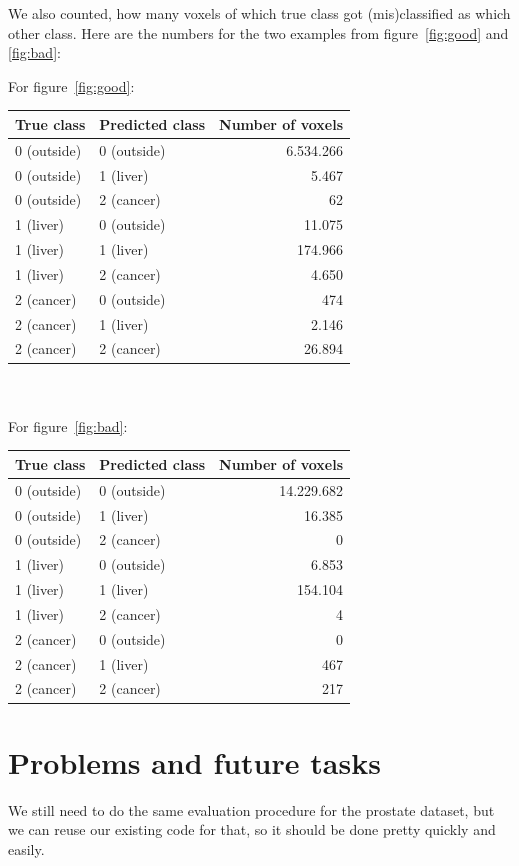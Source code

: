 \documentclass{article}
\begin{document}
		We also counted, how many voxels of which true class got (mis)classified as which other class. Here are the numbers for the two examples from figure~\ref{fig:good} and \ref{fig:bad}:

		For figure~\ref{fig:good}:

		\begin{tabular}{ | l | l || r | }
			\hline
			\textbf{True class} &
			\textbf{Predicted class} &
			\textbf{Number of voxels} \\ \hline
			0 (outside) & 0 (outside) & 6.534.266 \\ \hline
			0 (outside) & 1 (liver) & 5.467 \\ \hline
			0 (outside) & 2 (cancer) & 62 \\ \hline
			1 (liver) & 0 (outside) & 11.075 \\ \hline
			1 (liver) & 1 (liver) & 174.966 \\ \hline
			1 (liver) & 2 (cancer) & 4.650 \\ \hline
			2 (cancer) & 0 (outside) & 474 \\ \hline
			2 (cancer) & 1 (liver) & 2.146 \\ \hline
			2 (cancer) & 2 (cancer) & 26.894 \\ \hline
		\end{tabular}\\ \\

		For figure~\ref{fig:bad}:

		\begin{tabular}{ | l | l || r | }
			\hline
			\textbf{True class} &
			\textbf{Predicted class} &
			\textbf{Number of voxels} \\ \hline
			0 (outside) & 0 (outside) & 14.229.682 \\ \hline
			0 (outside) & 1 (liver) & 16.385 \\ \hline
			0 (outside) & 2 (cancer) & 0 \\ \hline
			1 (liver) & 0 (outside) & 6.853 \\ \hline
			1 (liver) & 1 (liver) & 154.104 \\ \hline
			1 (liver) & 2 (cancer) & 4 \\ \hline
			2 (cancer) & 0 (outside) & 0 \\ \hline
			2 (cancer) & 1 (liver) & 467 \\ \hline
			2 (cancer) & 2 (cancer) & 217 \\ \hline
		\end{tabular}

	\section{Problems and future tasks}

		We still need to do the same evaluation procedure for the prostate dataset, but we can reuse our existing code for that, so it should be done pretty quickly and easily.
\end{document}
